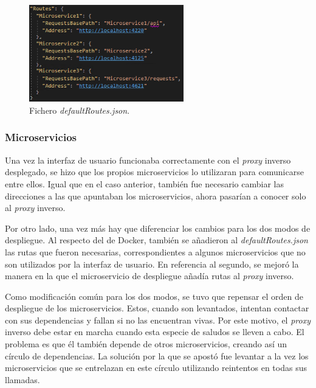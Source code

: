 \documentclass[11pt,spanish,listoffigures]{tfgetsinf}
\begin{document}
\begin{figure}[ht]
\centering
\includegraphics[width=0.6\textwidth]{imagenes/defaultRoutes}
\caption{Fichero \emph{defaultRoutes.json}.}
	\label{defaultRoutes}
\end{figure}


			\subsubsection{Microservicios}

Una vez la interfaz de usuario funcionaba correctamente con el \emph{proxy} inverso desplegado, se hizo que los propios microservicios lo utilizaran para comunicarse entre ellos. Igual que en el caso anterior, también fue necesario cambiar las direcciones a las que apuntaban los microservicios, ahora pasarían a conocer solo al \emph{proxy} inverso.

Por otro lado, una vez más hay que diferenciar los cambios para los dos modos de despliegue. Al respecto del de Docker, también se añadieron al \emph{defaultRoutes.json} las rutas que fueron necesarias, correspondientes a algunos microservicios que no son utilizados por la interfaz de usuario. En referencia al segundo, se mejoró la manera en la que el microservicio de despliegue añadía rutas al \emph{proxy} inverso.

Como modificación común para los dos modos, se tuvo que repensar el orden de despliegue de los microservicios. Estos, cuando son levantados, intentan contactar con sus dependencias y fallan si no las encuentran vivas. Por este motivo, el \emph{proxy} inverso debe estar en marcha cuando esta especie de saludos se lleven a cabo. El problema es que él también depende de otros microservicios, creando así un círculo de dependencias. La solución por la que se apostó fue levantar a la vez los microservicios que se entrelazan en este círculo utilizando reintentos en todas sus llamadas.
\end{document}
